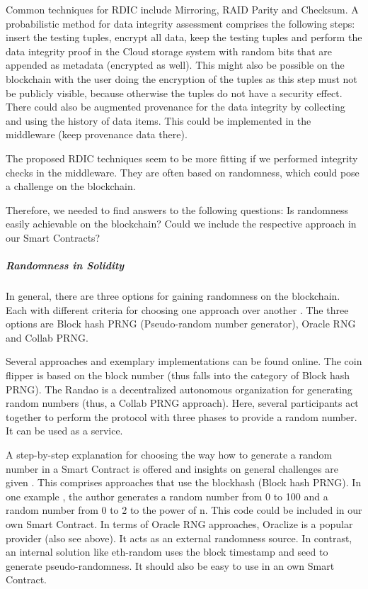 Common techniques for RDIC include Mirroring, RAID Parity and Checksum. A probabilistic method for data integrity assessment comprises the following steps: insert the testing tuples, encrypt all data, keep the testing tuples and perform the data integrity proof in the Cloud storage system with random bits that are appended as metadata (encrypted as well).
This might also be possible on the blockchain with the user doing the encryption of the tuples as this step must not be publicly visible, because otherwise the tuples do not have a security effect. There could also be augmented provenance for the data integrity by collecting and using the history of data items. This could be implemented in the middleware (keep provenance data there). \cite{relatedWork21}

The proposed RDIC techniques seem to be more fitting if we performed integrity checks in the middleware. They are often based on randomness, which could pose a challenge on the blockchain.

Therefore, we needed to find answers to the following questions: Is randomness easily achievable on the blockchain? Could we include the respective approach in our Smart Contracts?

\subparagraph{Randomness in Solidity}
In general, there are three options for gaining randomness on the blockchain. Each with different criteria for choosing one approach over another \cite{relatedWork22}. The three options are Block hash PRNG (Pseudo-random number generator), Oracle RNG and Collab PRNG.

Several approaches and exemplary implementations can be found online.
The coin flipper \cite{relatedWork23} is based on the block number (thus falls into the category of Block hash PRNG). The Randao \cite{relatedWork24} is a decentralized autonomous organization for generating random numbers (thus, a Collab PRNG approach). Here, several participants act together to perform the protocol with three phases to provide a random number. It can be used as a service.

A step-by-step explanation for choosing the way how to generate a random number in a Smart Contract is offered and insights on general challenges are given \cite{relatedWork25}. This comprises approaches that use the blockhash (Block hash PRNG).
In one example \cite{relatedWork26}, the author generates a random number from 0 to 100 and a random number from 0 to 2 to the power of n. This code could be included in our own Smart Contract.
In terms of Oracle RNG approaches, Oraclize \cite{relatedWork07} is a popular provider (also see above). It acts as an external randomness source.
In contrast, an internal solution like eth-random \cite{relatedWork27} uses the block timestamp and seed to generate pseudo-randomness. It should also be easy to use in an own Smart Contract.

